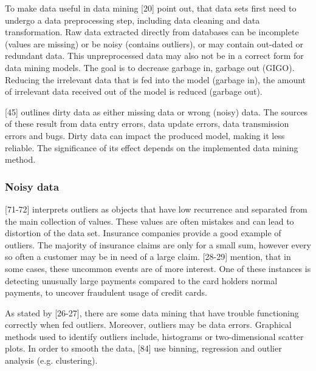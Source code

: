

To make data useful in data mining \textcite{DataMiningAndPredictiveAnalytics}[20] point out, that data sets first need to undergo a data preprocessing step, including data cleaning and data transformation. Raw data extracted directly from databases can be incomplete (values are missing) or be noisy (contains outliers), or may contain out-dated or redundant data. This unpreprocessed data may also not be in a correct form for data mining models. The goal is to decrease garbage in, garbage out (GIGO). Reducing the irrelevant data that is fed into the model (garbage in), the amount of irrelevant data received out of the model is reduced (garbage out).


\textcite{dataPreprocessingInDataMining}[45] outlines dirty data as either missing data or wrong (noisy) data. The sources of these result from data entry errors, data update errors, data transmission errors and bugs. Dirty data can impact the produced model, making it less reliable. The significance of its effect depends on the implemented data mining method.


\subsubsection{Noisy data}
\textcite{dataPreparationForDataMining}[71-72] interprets outliers as objects that have low recurrence and separated from the main collection of values. These values are often mistakes and can lead to distortion of the data set. Insurance companies provide a good example of outliers. The majority of insurance claims are only for a small sum, however every so often a customer may be in need of a large claim. \textcite{han2011data}[28-29] mention, that in some cases, these uncommon events are of more interest. One of these instances is detecting unusually large payments compared to the card holders normal payments, to uncover fraudulent usage of credit cards.

As stated by \textcite{DataMiningAndPredictiveAnalytics}[26-27], there are some data mining that have trouble functioning correctly when fed outliers. Moreover, outliers may be data errors. Graphical methods used to identify outliers include, histograms or two-dimensional scatter plots. In order to smooth the data, \textcite{han2011data}[84] use binning, regression and outlier analysis (e.g. clustering).


